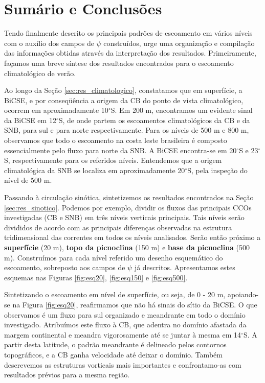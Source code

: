 \section{Sumário e Conclusões}\label{sec:sum_conclu}

\hspace{6mm} Tendo finalmente descrito os principais padrões de escoamento em vários níveis com o auxílio dos campos de
$\psi$ construídos, urge uma organização e compilação das informações obtidas através da interpretação dos resultados.
Primeiramente, façamos uma breve síntese dos resultados encontrados para o escoamento climatológico de verão.

Ao longo da Seção \ref{sec:res_climatologico}, constatamos que em superfície, a BiCSE, e por conseq\"uência 
a origem da CB do ponto de vista climatológico, ocorrem em aproximadamente 10$^\circ$S. 
Em 200 m, encontramos um evidente sinal da BiCSE
em 12$^\circ$S, de onde partem os escoamentos climatológicos da CB e da SNB, para sul e para norte respectivamente.
Para os níveis de 500 m e 800 m, observamos que todo o escoamento na costa leste brasileira é composto
essencialmente pelo fluxo para norte da SNB. A BiCSE encontra-se em 20$^\circ$S e 23$^\circ$S, respectivamente
para os referidos níveis. Entendemos que a origem climatológica da SNB se localiza em aproximadamente 20$^\circ$S, 
pela inspeção do nível de 500 m. 

Passando à circulação sinótica, sintetizemos os resultados encontrados na Seção \ref{sec:res_sinotico}. 
Podemos por exemplo, dividir os fluxos das principais CCOs investigadas (CB e SNB) em três níveis verticais
principais. Tais níveis serão divididos de acordo com as principais diferenças observadas na estrutura tridimensional das
correntes em todos os níveis analisados. Serão então próximo a {\bf superfície} (20 m), {\bf topo da picnoclina} (150 m) 
e {\bf base da picnoclina} (500 m). Construímos para cada nível referido um desenho esquemático do escoamento, sobreposto
aos campos de $\psi$ já descritos. Apresentamos estes esquemas nas Figuras \ref{fig:esq20}, \ref{fig:esq150}
e \ref{fig:esq500}. 

Sintetizando o escoamento em nível de superfície, ou seja, de 0 - 20 m, apoiando-se na Figura \ref{fig:esq20}, 
reafirmamos que não há sinais do sítio da BiCSE. O que observamos é um fluxo para sul organizado e meandrante em 
todo o domínio investigado.
Atribuímos este fluxo à CB, que adentra no domínio afastada da margem continental e meandra vigorosamente
até se juntar à mesma em 14$^\circ$S. A partir desta latitude, o padrão meandrante é delineado pelos contornos topográficos,
e a CB ganha velocidade até deixar o domínio.
Também descrevemos as estruturas vorticais mais importantes e confrontamo-as com resultados
prévios para a mesma região. 

